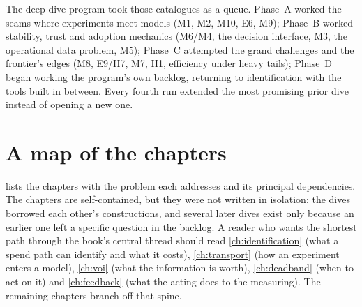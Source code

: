 The deep-dive program took those catalogues as a queue. Phase~A worked the seams where experiments meet
models (M1, M2, M10, E6, M9); Phase~B worked stability, trust and adoption mechanics (M6/M4, the decision
interface, M3, the operational data problem, M5); Phase~C attempted the grand challenges and the frontier's
edges (M8, E9/H7, M7, H1, efficiency under heavy tails); Phase~D began working the program's own backlog,
returning to identification with the tools built in between. Every fourth run extended the most promising
prior dive instead of opening a new one.

\section*{A map of the chapters}

 lists the chapters with the problem each addresses and its principal dependencies. The
chapters are self-contained, but they were not written in isolation: the dives borrowed each other's
constructions, and several later dives exist only because an earlier one left a specific question in the
backlog. A reader who wants the shortest path through the book's central thread should read
\cref{ch:identification} (what a spend path can identify and what it costs), \cref{ch:transport} (how an
experiment enters a model), \cref{ch:voi} (what the information is worth), \cref{ch:deadband} (when to act on
it) and \cref{ch:feedback} (what the acting does to the measuring). The remaining chapters branch off that
spine.

